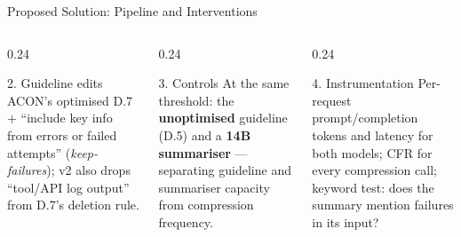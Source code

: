 \documentclass[aspectratio=169,10pt]{beamer}
\begin{document}
\begin{frame}{Proposed Solution: Pipeline and Interventions}
\begin{columns}[T]
\begin{column}{0.24\textwidth}
\begin{block}{2. Guideline edits}
\scriptsize
ACON's optimised D.7 $+$ ``include key info from errors or failed attempts''
(\emph{keep-failures}); v2 also drops ``tool/API log output'' from D.7's
deletion rule.
\end{block}
\end{column}
\begin{column}{0.24\textwidth}
\begin{block}{3. Controls}
\scriptsize
At the same threshold: the \textbf{unoptimised} guideline (D.5) and a
\textbf{14B summariser} --- separating guideline and summariser capacity
from compression frequency.
\end{block}
\end{column}
\begin{column}{0.24\textwidth}
\begin{block}{4. Instrumentation}
\scriptsize
Per-request prompt/completion tokens and latency for both models; CFR for
every compression call; keyword test: does the summary mention failures in its
input?
\end{block}
\end{column}
\end{columns}
\end{frame}

\end{document}
